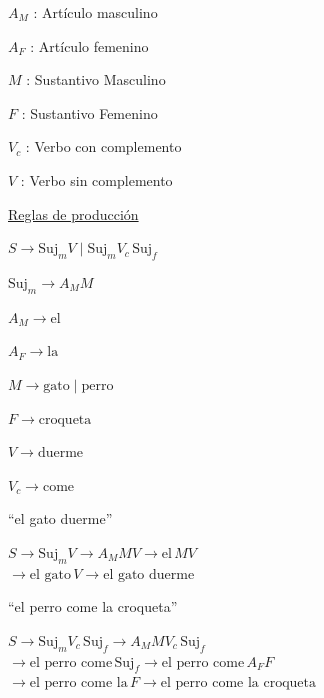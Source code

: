 \vspace{0.2cm}
\noindent $A_M$ : Artículo masculino

\vspace{0.2cm}
\noindent $A_F$ : Artículo femenino

\vspace{0.2cm}
\noindent $M$ : Sustantivo Masculino

\vspace{0.2cm}
\noindent $F$ : Sustantivo Femenino

\vspace{0.2cm}
\noindent $V_c$ : Verbo con complemento

\vspace{0.2cm}
\noindent $V$ : Verbo sin complemento

\vspace{0.6cm}
\underline{\noindent Reglas de producción}

\vspace{0.3cm}
\noindent $S \rightarrow \text{Suj}_m V \mid \text{Suj}_m V_c \, \text{Suj}_f$

\vspace{0.25cm}
\noindent $\text{Suj}_m \rightarrow A_M M$

\vspace{0.25cm}
\noindent $A_M \rightarrow \text{el}$

\vspace{0.25cm}
\noindent $A_F \rightarrow \text{la}$

\vspace{0.25cm}
\noindent $M \rightarrow \text{gato} \mid \text{perro}$

\vspace{0.25cm}
\noindent $F \rightarrow \text{croqueta}$

\vspace{0.25cm}
\noindent $V \rightarrow \text{duerme}$

\vspace{0.25cm}
\noindent $V_c \rightarrow \text{come}$

\vspace{0.3cm}
\noindent ``el gato duerme''

\vspace{0.25cm}
\noindent $S \rightarrow \text{Suj}_m V \rightarrow A_M M V \rightarrow \text{el} \, M V$ \\
\hspace*{0.5cm} $\rightarrow \text{el gato} \, V \rightarrow \text{el gato duerme}$

\vspace{0.6cm}
\noindent ``el perro come la croqueta''

\vspace{0.25cm}
\noindent $S \rightarrow \text{Suj}_m V_c \, \text{Suj}_f \rightarrow A_M M V_c \, \text{Suj}_f$ \\
\hspace*{0.5cm} $\rightarrow \text{el perro come} \, \text{Suj}_f \rightarrow \text{el perro come} \, A_F F$ \\
\hspace*{0.5cm} $\rightarrow \text{el perro come la} \, F \rightarrow \text{el perro come la croqueta}$